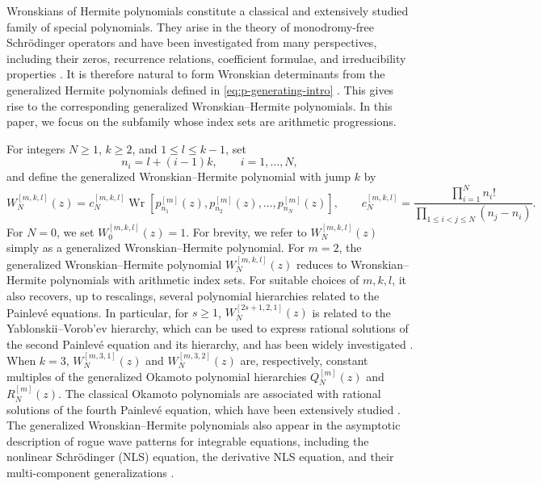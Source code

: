 \documentclass[preprint,3p,10pt]{elsarticle}
\DeclareMathOperator{\Wr}{Wr}
\theoremstyle{definition}
\begin{document}
Wronskians of Hermite polynomials constitute a classical and extensively studied family of special
polynomials. They arise in the theory of monodromy-free Schr\"odinger operators \cite{oblomkov1999monodromy}
and have been investigated from many perspectives, including their zeros, recurrence relations, coefficient formulae, and irreducibility properties \cite{felder2026harmonic,felder2012zeros,bonneux2018recurrence,
bonneux2020coefficients,grosu2021irreducibility,gomez2021complete}. It is therefore natural to form Wronskian determinants from the generalized Hermite polynomials defined in \eqref{eq:p-generating-intro} \cite{zhang2022rogue,yang2023rogue,bonneux2020coefficients,bonneux2020asymptotic,grosu2021expansion}. This gives rise to the
corresponding generalized Wronskian--Hermite polynomials. In this paper,
we focus on the subfamily whose index sets are arithmetic progressions.

For integers \(N\ge1\), \(k\ge2\), and \(1\le l\le k-1\), set
\begin{equation}\label{eq:nodes-intro}
    n_i=l+(i-1)k,\qquad i=1,\ldots,N,
\end{equation}
and define the generalized Wronskian--Hermite polynomial
with jump \(k\) by
\begin{equation}\label{eqn:Wronskian-Hermite-poly-with-jump-k}
    W_N^{[m,k,l]}(z)
    =
    c_N^{[m,k,l]}
    \Wr \!\left[
        p_{n_1}^{[m]}(z),p_{n_2}^{[m]}(z),\ldots,p_{n_N}^{[m]}(z)
    \right],
    \qquad
    c_N^{[m,k,l]}
    =
    \frac{\prod_{i=1}^{N}n_i!}
         {\prod_{1\le i<j\le N}(n_j-n_i)}.
\end{equation}
For \(N=0\), we set $W_0^{[m,k,l]}(z)=1.$ For brevity, we refer to \(W_N^{[m,k,l]}(z)\) simply as a generalized
Wronskian--Hermite polynomial.
For \(m=2\), the generalized Wronskian--Hermite polynomial \(W_N^{[m,k,l]}(z)\) reduces to
Wronskian--Hermite polynomials with arithmetic index sets.  For suitable choices of \(m,k,l\), it also recovers, up to rescalings, several
polynomial hierarchies related to the Painlev\'e equations. In particular, for $s \geq 1$,
\(W_N^{[2s+1,2,1]}(z)\) is related to the Yablonskii--Vorob'ev hierarchy, which
can be used to express rational solutions of the second Painlev\'e equation and its hierarchy, and has been widely investigated
\cite{clarkson2003second,fukutani2000special,yang2023rogue,bertola2024exactly,balogh2016hankel,bertola2015zeros,BuckinghamMiller2014PII,BuckinghamMiller2015PIICritical}. When \(k=3\), \(W_N^{[m,3,1]}(z)\) and \(W_N^{[m,3,2]}(z)\) are, respectively, constant multiples
of the generalized Okamoto polynomial hierarchies \(Q_N^{[m]}(z)\) and
\(R_N^{[m]}(z)\). The classical Okamoto polynomials are associated
with rational solutions of the fourth Painlev\'e equation, which have been extensively studied
\cite{Okamoto1986StudiesPainleveIII,kametaka1983poles,noumi1999symmetries,clarkson2003fourth,yang2023rogue,roffelsen2025real}.
The generalized Wronskian–Hermite polynomials also appear in the asymptotic description of
rogue wave patterns for integrable equations, including the nonlinear
Schr\"odinger (NLS) equation, the derivative NLS equation, and their
multi-component generalizations
\cite{yang2021rogue,yang2023rogue,zhang2022rogue,lin2024rogue}. 
\end{document}
